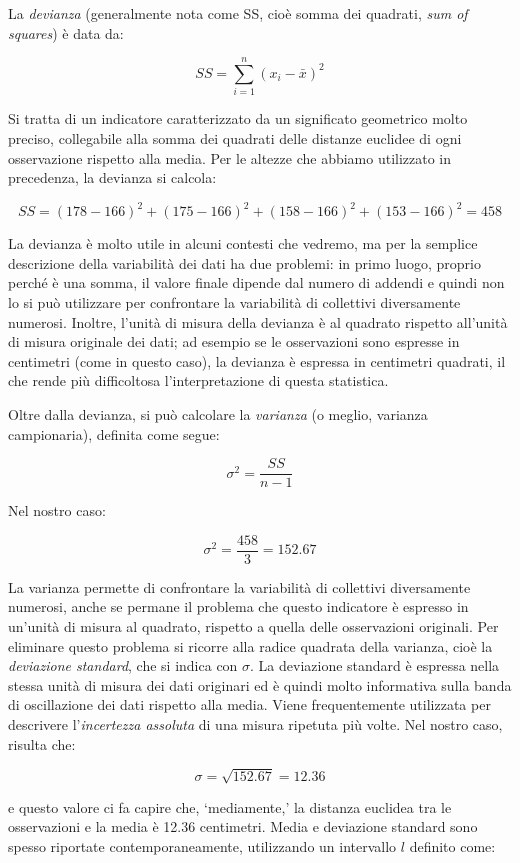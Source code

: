 \documentclass[a4paper,12pt,oneside]{book}
\begin{document}
La \emph{devianza} (generalmente nota come SS, cioè somma dei quadrati, \emph{sum of squares}) è data da:

\[SS = \sum\limits_{i = 1}^n {(x_i  - \bar x)^2 }\]

Si tratta di un indicatore caratterizzato da un significato geometrico molto preciso, collegabile alla somma dei quadrati delle distanze euclidee di ogni osservazione rispetto alla media. Per le altezze che abbiamo utilizzato in precedenza, la devianza si calcola:

\[SS = \left(178 - 166 \right)^2 + \left(175 - 166 \right)^2 + \left(158 - 166 \right)^2  + \left(153 - 166 \right)^2= 458\]

La devianza è molto utile in alcuni contesti che vedremo, ma per la semplice descrizione della variabilità dei dati ha due problemi: in primo luogo, proprio perché è una somma, il valore finale dipende dal numero di addendi e quindi non lo si può utilizzare per confrontare la variabilità di collettivi diversamente numerosi. Inoltre, l'unità di misura della devianza è al quadrato rispetto all'unità di misura originale dei dati; ad esempio se le osservazioni sono espresse in centimetri (come in questo caso), la devianza è espressa in centimetri quadrati, il che rende più difficoltosa l'interpretazione di questa statistica.

Oltre dalla devianza, si può calcolare la \emph{varianza} (o meglio, varianza campionaria), definita come segue:

\[\sigma^2  = \frac{SS}{n - 1}\]

Nel nostro caso:

\[\sigma^2  = \frac{458}{3} = 152.67\]

La varianza permette di confrontare la variabilità di collettivi diversamente numerosi, anche se permane il problema che questo indicatore è espresso in un'unità di misura al quadrato, rispetto a quella delle osservazioni originali. Per eliminare questo problema si ricorre alla radice quadrata della varianza, cioè la \emph{deviazione standard}, che si indica con \(\sigma\). La deviazione standard è espressa nella stessa unità di misura dei dati originari ed è quindi molto informativa sulla banda di oscillazione dei dati rispetto alla media. Viene frequentemente utilizzata per descrivere l'\emph{incertezza assoluta} di una misura ripetuta più volte. Nel nostro caso, risulta che:

\[\sigma  = \sqrt{152.67} = 12.36\]

e questo valore ci fa capire che, `mediamente,' la distanza euclidea tra le osservazioni e la media è 12.36 centimetri. Media e deviazione standard sono spesso riportate contemporaneamente, utilizzando un intervallo \(l\) definito come:
\end{document}
